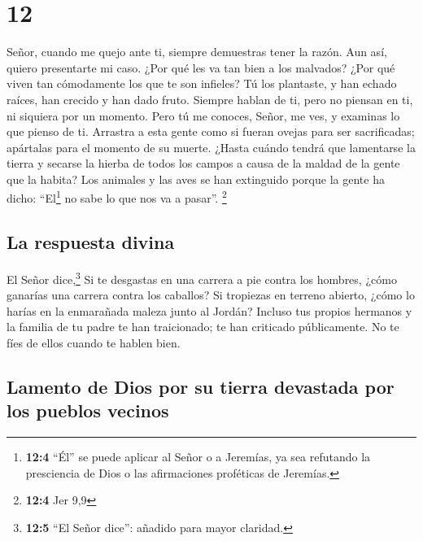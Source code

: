 \hypertarget{section-11}{%
\section{12}\label{section-11}}

 Señor, cuando me quejo ante ti, siempre demuestras tener
la razón. Aun así, quiero presentarte mi caso. ¿Por qué les va tan bien
a los malvados? ¿Por qué viven tan cómodamente los que te son infieles?
 Tú los plantaste, y han echado raíces, han crecido y han
dado fruto. Siempre hablan de ti, pero no piensan en ti, ni siquiera por
un momento.  Pero tú me conoces, Señor, me ves, y examinas
lo que pienso de ti. Arrastra a esta gente como si fueran ovejas para
ser sacrificadas; apártalas para el momento de su muerte. 
¿Hasta cuándo tendrá que lamentarse la tierra y secarse la hierba de
todos los campos a causa de la maldad de la gente que la habita? Los
animales y las aves se han extinguido porque la gente ha dicho:
``El\footnote{\textbf{12:4} ``Él'' se puede aplicar al Señor o a
  Jeremías, ya sea refutando la presciencia de Dios o las afirmaciones
  proféticas de Jeremías.} no sabe lo que nos va a pasar''. \footnote{\textbf{12:4}
  Jer 9,9}

\hypertarget{la-respuesta-divina}{%
\subsection{La respuesta divina}\label{la-respuesta-divina}}

 El Señor dice,\footnote{\textbf{12:5} ``El Señor dice'':
  añadido para mayor claridad.} Si te desgastas en una carrera a pie
contra los hombres, ¿cómo ganarías una carrera contra los caballos? Si
tropiezas en terreno abierto, ¿cómo lo harías en la enmarañada maleza
junto al Jordán?  Incluso tus propios hermanos y la
familia de tu padre te han traicionado; te han criticado públicamente.
No te fíes de ellos cuando te hablen bien.

\hypertarget{lamento-de-dios-por-su-tierra-devastada-por-los-pueblos-vecinos}{%
\subsection{Lamento de Dios por su tierra devastada por los pueblos
vecinos}\label{lamento-de-dios-por-su-tierra-devastada-por-los-pueblos-vecinos}}

